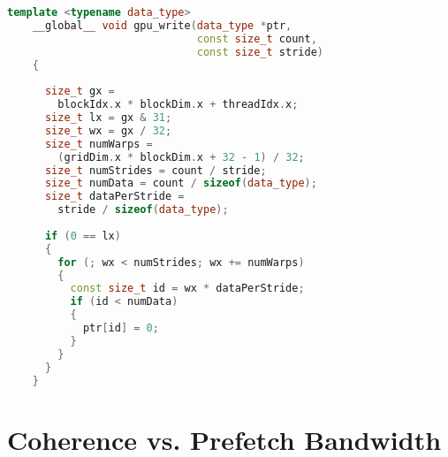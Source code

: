 \begin{minipage}{\textwidth}
\begin{lstlisting}[language=c++, caption=\texttt{gpu\_write} function., label=lst:gpu-write]
    template <typename data_type>
    __global__ void gpu_write(data_type *ptr,
                              const size_t count,
                              const size_t stride)
    {
    
      size_t gx = 
        blockIdx.x * blockDim.x + threadIdx.x;
      size_t lx = gx & 31;
      size_t wx = gx / 32;
      size_t numWarps = 
        (gridDim.x * blockDim.x + 32 - 1) / 32;
      size_t numStrides = count / stride;
      size_t numData = count / sizeof(data_type);
      size_t dataPerStride = 
        stride / sizeof(data_type);
    
      if (0 == lx)
      {
        for (; wx < numStrides; wx += numWarps)
        {
          const size_t id = wx * dataPerStride;
          if (id < numData)
          {
            ptr[id] = 0;
          }
        }
      }
    }
\end{lstlisting}
\end{minipage}

%
%
%
\section{Coherence vs. Prefetch Bandwidth}
\label{sec:um-coherence-prefetch}

